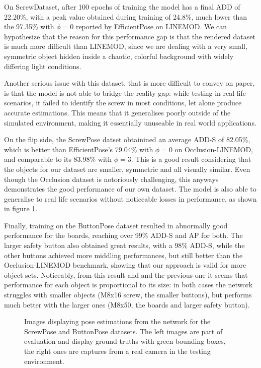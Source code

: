 On ScrewDataset, after 100 epochs of training the model has a final ADD of 22.20\%, with a peak value obtained during training of 24.8\%, much lower than the 97.35\% with $\phi=0$ reported by EfficientPose on LINEMOD. We can hypothesize that the reason for this performance gap is that the rendered dataset is much more difficult than LINEMOD, since we are dealing with a very small, symmetric object hidden inside a chaotic, colorful background with widely differing light conditions.

Another serious issue with this dataset, that is more difficult to convey on paper, is that the model is not able to bridge the reality gap: while testing in real-life scenarios, it failed to identify the screw in most conditions, let alone produce accurate estimations. This means that it generalises poorly outside of the simulated environment, making it essentially unuseable in real world applications.

On the flip side, the ScrewPose datset obtainined an average ADD-S of 82.05\%, which is better than EfficientPose's 79.04\% with $\phi=0$ on Occlusion-LINEMOD, and comparable to its 83.98\% with $\phi = 3$. This is a good result considering that the objects for our dataset are smaller, symmetric and all visually similar. Even though the Occlusion dataset is notoriously challenging, this anyways demonstrates the good performance of our own dataset. The model is also able to generalise to real life scenarios without noticeable losses in performance, as shown in figure \ref*{fig:inferencing}.

Finally, training on the ButtonPose dataset resulted in abnormally good performance for the boards, reaching over 99\% ADD-S and AP for both. The larger safety button also obtained great results, with a 98\% ADD-S, while the other buttons achieved more middling performances, but still better than the Occlusion-LINEMOD benchmark, showing that our approach is valid for more object sets. Noticeably, from this result and and the previous one it seems that performance for each object is proportional to its size: in both cases the network struggles with smaller objects (M8x16 screw, the smaller buttons), but performs much better with the larger ones (M8x50, the boards and larger safety button).

\begin{figure}[htp]


    \caption{Images displaying pose estimations from the network for the ScrewPose and ButtonPose datasets. The left images are part of evaluation and display ground truths with green bounding boxes, the right ones are captures from a real camera in the testing environment.}
    \label{fig:inferencing}
\end{figure}

